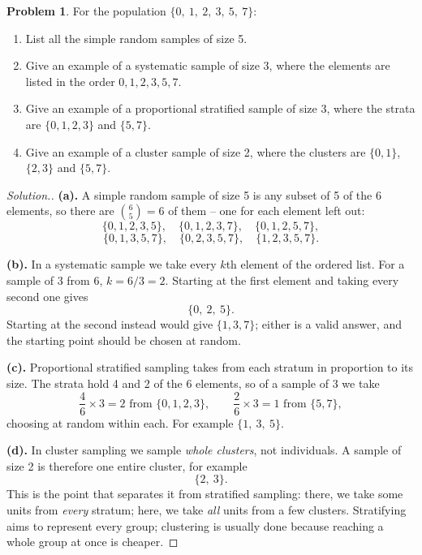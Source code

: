 \documentclass[11pt,a4paper]{article}
\theoremstyle{definition}
\newtheorem{problemx}{Problem}[section]
\newenvironment{problem}{\begin{problemx}}{\end{problemx}}
\newenvironment{solution}
  {\renewcommand{\qedsymbol}{}\begin{proof}[\textit{Solution}.]}
  {\end{proof}}
\begin{document}
\begin{problem}
For the population $\{0,\ 1,\ 2,\ 3,\ 5,\ 7\}$:
\begin{enumerate}
\item[(a).] List all the simple random samples of size 5.
\item[(b).] Give an example of a systematic sample of size 3, where the elements are listed
in the order $0, 1, 2, 3, 5, 7$.
\item[(c).] Give an example of a proportional stratified sample of size 3, where the strata
are $\{0,1,2,3\}$ and $\{5,7\}$.
\item[(d).] Give an example of a cluster sample of size 2, where the clusters are
$\{0,1\}$, $\{2,3\}$ and $\{5,7\}$.
\end{enumerate}
\end{problem}

\begin{solution}
\textbf{(a).} A simple random sample of size 5 is any subset of 5 of the 6 elements, so
there are $\binom{6}{5} = 6$ of them -- one for each element left out:
\[\{0,1,2,3,5\},\quad \{0,1,2,3,7\},\quad \{0,1,2,5,7\},\]
\[\{0,1,3,5,7\},\quad \{0,2,3,5,7\},\quad \{1,2,3,5,7\}.\]

\textbf{(b).} In a systematic sample we take every $k$th element of the ordered list. For a
sample of 3 from 6, $k = 6/3 = 2$. Starting at the first element and taking every second
one gives
\[\{0,\ 2,\ 5\}.\]
Starting at the second instead would give $\{1,3,7\}$; either is a valid answer, and the
starting point should be chosen at random.

\textbf{(c).} Proportional stratified sampling takes from each stratum in proportion to its
size. The strata hold 4 and 2 of the 6 elements, so of a sample of 3 we take
\[\frac{4}{6}\times 3 = 2 \text{ from } \{0,1,2,3\}, \qquad
\frac{2}{6}\times 3 = 1 \text{ from } \{5,7\},\]
choosing at random within each. For example $\{1,\ 3,\ 5\}$.

\textbf{(d).} In cluster sampling we sample \emph{whole clusters}, not individuals. A
sample of size 2 is therefore one entire cluster, for example
\[\{2,\ 3\}.\]
This is the point that separates it from stratified sampling: there, we take some units
from \emph{every} stratum; here, we take \emph{all} units from a few clusters. Stratifying
aims to represent every group; clustering is usually done because reaching a whole group at
once is cheaper.
\end{solution}
\end{document}
